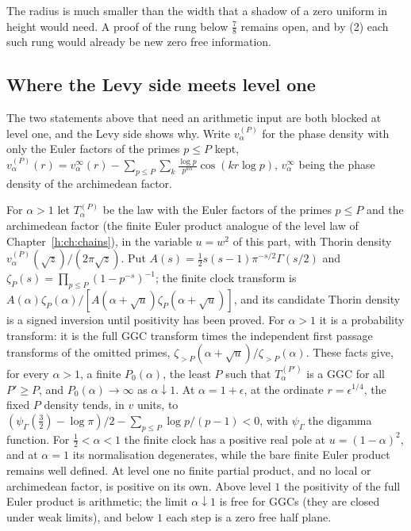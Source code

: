 The radius is much smaller than the width that a shadow of a zero uniform in height would need. A proof of the rung below $\tfrac78$ remains open, and by (2) each such rung would already be new zero free information.

\subsection{Where the Levy side meets level one}

The two statements above that need an arithmetic input are both blocked at level one, and the Levy side shows why. Write $v^{(P)}_\alpha$ for the phase density with only the Euler factors of the primes $p\le P$ kept, $v^{(P)}_\alpha(r)=v^\infty_\alpha(r)-\sum_{p\le P}\sum_k\frac{\log p}{p^{k\alpha}}\cos(kr\log p)$, $v^\infty_\alpha$ being the phase density of the archimedean factor.

\begin{remark}\label{qt:rem:eulerlevel}
For $\alpha>1$ let $T^{(P)}_\alpha$ be the law with the Euler factors of the primes $p\le P$ and the archimedean factor (the finite Euler product analogue of the level law of Chapter~\ref{h:ch:chains}), in the variable $u=w^2$ of this part, with Thorin density $v^{(P)}_\alpha(\sqrt z)/(2\pi\sqrt z)$. Put $A(s)=\tfrac12s(s-1)\pi^{-s/2}\Gamma(s/2)$ and $\zeta_P(s)=\prod_{p\le P}(1-p^{-s})^{-1}$; the finite clock transform is $A(\alpha)\zeta_P(\alpha)/[A(\alpha+\sqrt u)\zeta_P(\alpha+\sqrt u)]$, and its candidate Thorin density is a signed inversion until positivity has been proved. For $\alpha>1$ it is a probability transform: it is the full GGC transform times the independent first passage transforms of the omitted primes, $\zeta_{>P}(\alpha+\sqrt u)/\zeta_{>P}(\alpha)$. These facts give, for every $\alpha>1$, a finite $P_0(\alpha)$, the least $P$ such that $T^{(P')}_\alpha$ is a GGC for all $P'\ge P$, and $P_0(\alpha)\to\infty$ as $\alpha\downarrow1$. At $\alpha=1+\epsilon$, at the ordinate $r=\epsilon^{1/4}$, the fixed $P$ density tends, in $v$ units, to $(\psi_\Gamma(\tfrac32)-\log\pi)/2-\sum_{p\le P}\log p/(p-1)<0$, with $\psi_\Gamma$ the digamma function. For $\tfrac12<\alpha<1$ the finite clock has a positive real pole at $u=(1-\alpha)^2$, and at $\alpha=1$ its normalisation degenerates, while the bare finite Euler product remains well defined. At level one no finite partial product, and no local or archimedean factor, is positive on its own. Above level $1$ the positivity of the full Euler product is arithmetic; the limit $\alpha\downarrow1$ is free for GGCs (they are closed under weak limits), and below $1$ each step is a zero free half plane.
\end{remark}
